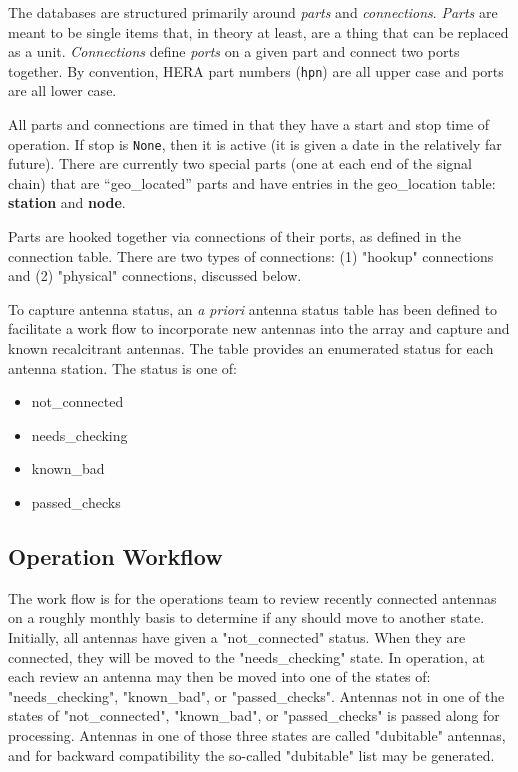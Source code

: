\documentclass{article}
\begin{document}
The databases are structured primarily around {\em parts} and {\em connections}.  {\em Parts} are meant to be single items that, in theory at least, are a thing that can be replaced as a unit.
{\em Connections} define {\em ports} on a given part and connect two ports together.  By convention, HERA part numbers ({\tt hpn}) are all upper case and ports are all lower case.

All parts and connections are timed in that they have a start and stop time of operation.  If stop is {\tt None}, then it is active (it is given a date in the relatively far future).  There are currently two special parts (one at each end of the signal chain) that are ``geo\_located'' parts and have entries in the geo\_location table: {\bf station} and {\bf node}.

Parts are hooked together via connections of their ports, as defined in the connection table.   There are two types of connections:  (1) "hookup" connections and (2) "physical" connections, discussed below.

To capture antenna status, an {\em a priori} antenna status table has been defined to facilitate a work flow to incorporate new antennas into the array and capture and known recalcitrant antennas.  The table provides an enumerated status for each antenna station.  The status is one of:
\begin{itemize}\setlength\itemsep{-.3em}
	\item not\_connected
	\item needs\_checking
	\item known\_bad
	\item passed\_checks
\end{itemize}


\subsection{Operation Workflow}
The work flow is for the operations team to review recently connected antennas on a roughly monthly basis to determine if any should move to another state.  Initially, all antennas have given a "not\_connected" status.  When they are connected, they will be moved to the "needs\_checking" state.  In operation, at each review an antenna may then be moved into one of the states of:  "needs\_checking", "known\_bad", or "passed\_checks".  Antennas not in one of the states of "not\_connected", "known\_bad", or "passed\_checks" is passed along for processing.  Antennas in one of those three states are called "dubitable" antennas, and for backward compatibility the so-called "dubitable" list may be generated.
\end{document}
